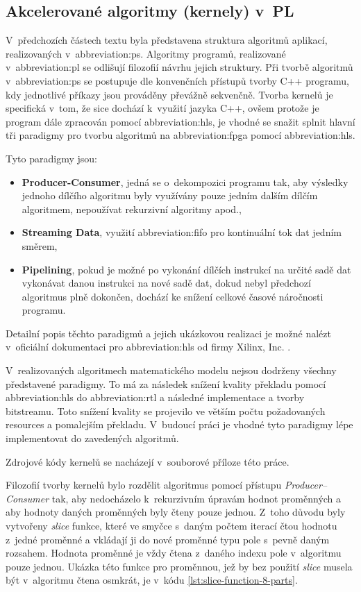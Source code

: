 \documentclass[a4paper, twoside, 11pt]{article}
\begin{document}
	\subsection{Akcelerované algoritmy (kernely) v~PL}\label{subsec:akcelerovane-algoritmy-kernely-v-pl}
		V~předchozích částech textu byla představena struktura algoritmů aplikací, realizovaných v~\gls{abbreviation:ps}. Algoritmy programů, realizované v~\gls{abbreviation:pl} se odlišují filozofií návrhu jejich struktury. Při tvorbě algoritmů v~\gls{abbreviation:ps} se postupuje dle konvenčních přístupů tvorby C++ programu, kdy jednotlivé příkazy jsou prováděny převážně sekvenčně. Tvorba kernelů je specifická v~tom, že sice dochází k~využití jazyka C++, ovšem protože je program dále zpracován pomocí \gls{abbreviation:hls}, je vhodné se snažit splnit hlavní tři paradigmy pro tvorbu algoritmů na \gls{abbreviation:fpga} pomocí \gls{abbreviation:hls}.\par
		Tyto paradigmy jsou:
		\begin{itemize}
			\item \textbf{Producer-Consumer}, jedná se o~dekompozici programu tak, aby výsledky jednoho dílčího algoritmu byly využívány pouze jedním dalším dílčím algoritmem, nepoužívat rekurzivní algoritmy apod.,
			\item \textbf{Streaming Data}, využití \gls{abbreviation:fifo} pro kontinuální tok dat jedním směrem,
			\item \textbf{Pipelining}, pokud je možné po vykonání dílčích instrukcí na určité sadě dat vykonávat danou instrukci na nové sadě dat, dokud nebyl předchozí algoritmus plně dokončen, dochází ke snížení celkové časové náročnosti programu. 
		\end{itemize}
		Detailní popis těchto paradigmů a jejich ukázkovou realizaci je možné nalézt v~oficiální dokumentaci pro \gls{abbreviation:hls} od firmy Xilinx, Inc. \cite{vitis-high-level-synthesis-user-guide}.\par
		V~realizovaných algoritmech matematického modelu nejsou dodrženy všechny představené paradigmy. To má za následek snížení kvality překladu pomocí \gls{abbreviation:hls} do \gls{abbreviation:rtl} a následné implementace a tvorby bitstreamu. Toto snížení kvality se projevilo ve větším počtu požadovaných resources a pomalejším překladu. V~budoucí práci je vhodné tyto paradigmy lépe implementovat do zavedených algoritmů.\par
		Zdrojové kódy kernelů se nacházejí v~souborové příloze této práce.\par
		Filozofií tvorby kernelů bylo rozdělit algoritmus pomocí přístupu \textit{Producer–Consumer} tak, aby nedocházelo k~rekurzivním úpravám hodnot proměnných a aby hodnoty daných proměnných byly čteny pouze jednou. Z~toho důvodu byly vytvořeny \textit{slice} funkce, které ve smyčce s~daným počtem iterací čtou hodnotu z~jedné proměnné a vkládají ji do nové proměnné typu pole s~pevně daným rozsahem. Hodnota proměnné je vždy čtena z~daného indexu pole v~algoritmu pouze jednou. Ukázka této funkce pro proměnnou, jež by bez použití \textit{slice} musela být v~algoritmu čtena osmkrát, je v~kódu \ref{lst:slice-function-8-parts}.\par
\end{document}
